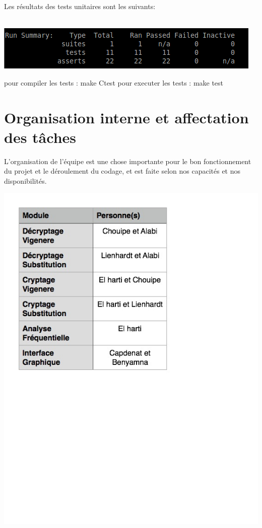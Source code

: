 \documentclass[a4]{article}
\begin{document}
  
Les résultats des tests unitaires sont les suivants:\\ \\ 
		 \begin{center}\includegraphics[scale=0.5]{Capture.png}\end{center}
	pour compiler les tests : make Ctest
	pour executer les tests : make test
	\section{Organisation interne et affectation des tâches}
	L'organisation de l'équipe est une chose importante pour le bon fonctionnement du
  projet et le déroulement du codage, et est faite selon nos capacités et nos disponibilités.  \\ 
		 \begin{center}\includegraphics[scale=0.5]{tableau_tache_final.jpg}\end{center}
\end{document}
